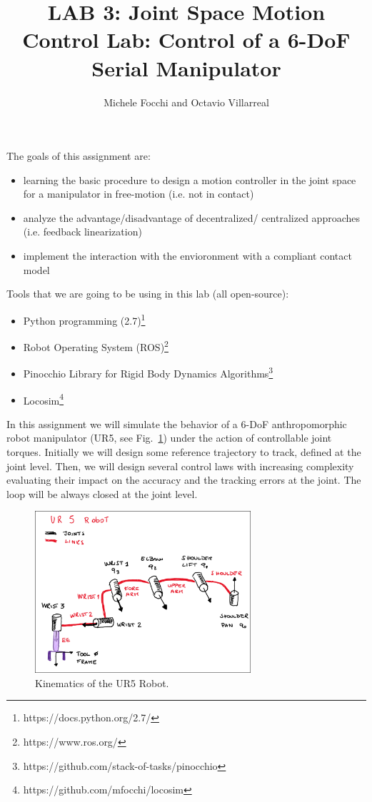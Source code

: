 \documentclass[11pt]{article}
\title{LAB 3: Joint Space Motion Control Lab: Control of a 6-DoF Serial Manipulator}
\author{Michele Focchi and Octavio Villarreal}
\date{}
\begin{document}
	\maketitle
	\noindent
	The goals of this assignment are:
	\begin{itemize}
		\item learning the basic procedure to design a motion controller in the joint space for a manipulator in free-motion (i.e. not in contact)
		\item analyze the advantage/disadvantage of decentralized/ centralized approaches (i.e. feedback linearization)
		\item implement the interaction with the envioronment with a compliant contact model	 
	\end{itemize}
	
	\noindent
	Tools that we are going to be using in this lab (all open-source):
	\begin{itemize}
		\item Python programming (2.7)\footnote{https://docs.python.org/2.7/}
		\item Robot Operating System (ROS)\footnote{https://www.ros.org/}
		\item Pinocchio Library for Rigid Body Dynamics Algorithms\footnote{https://github.com/stack-of-tasks/pinocchio}
		\item Locosim\footnote{https://github.com/mfocchi/locosim}
	\end{itemize}
	In this assignment we will simulate the behavior of a 6-DoF anthropomorphic robot manipulator (UR5, see  Fig.~\ref{fig:UR5}) under the action of controllable joint torques. Initially we will design some reference trajectory to track, defined at the joint level. Then, we will design several control laws with increasing complexity evaluating their impact on the accuracy and the tracking errors at the joint. The loop will be always closed at the joint level.  
 
 \begin{figure}[bht]
 	\centering
 	\includegraphics[width=8cm]{ur5_Robot.pdf}
 	\caption{Kinematics of the UR5 Robot.}
 	\label{fig:UR5}
 \end{figure}
\end{document}
